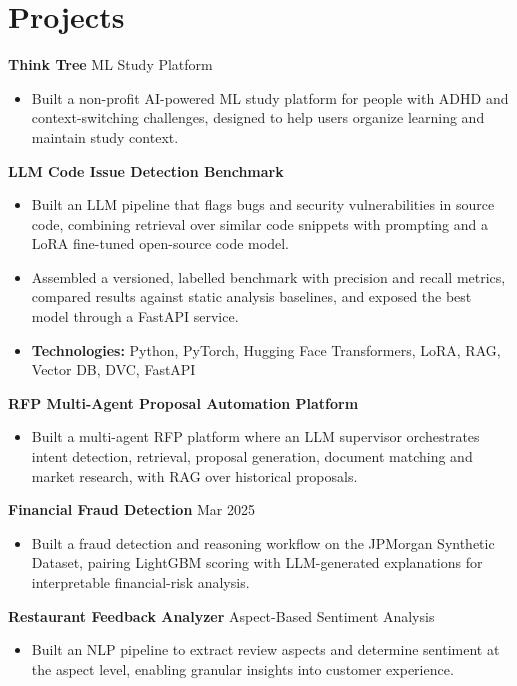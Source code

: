 \documentclass[10pt,a4paper]{article}
\begin{document}
\section{Projects}
\textbf{Think Tree} \textbar{} ML Study Platform\par
\begin{itemize}
  \item Built a non-profit AI-powered ML study platform for people with ADHD and context-switching challenges, designed to help users organize learning and maintain study context.
\end{itemize}
\textbf{LLM Code Issue Detection Benchmark}\par
\begin{itemize}
  \item Built an LLM pipeline that flags bugs and security vulnerabilities in source code, combining retrieval over similar code snippets with prompting and a LoRA fine-tuned open-source code model.
  \item Assembled a versioned, labelled benchmark with precision and recall metrics, compared results against static analysis baselines, and exposed the best model through a FastAPI service.
  \item \textbf{Technologies:} Python, PyTorch, Hugging Face Transformers, LoRA, RAG, Vector DB, DVC, FastAPI
\end{itemize}
\textbf{RFP Multi-Agent Proposal Automation Platform}\par
\begin{itemize}
  \item Built a multi-agent RFP platform where an LLM supervisor orchestrates intent detection, retrieval, proposal generation, document matching and market research, with RAG over historical proposals.
\end{itemize}
\textbf{Financial Fraud Detection} \textbar{} Mar 2025\par
\begin{itemize}
  \item Built a fraud detection and reasoning workflow on the JPMorgan Synthetic Dataset, pairing LightGBM scoring with LLM-generated explanations for interpretable financial-risk analysis.
\end{itemize}
\textbf{Restaurant Feedback Analyzer} \textbar{} Aspect-Based Sentiment Analysis\par
\begin{itemize}
  \item Built an NLP pipeline to extract review aspects and determine sentiment at the aspect level, enabling granular insights into customer experience.
\end{itemize}
\end{document}

